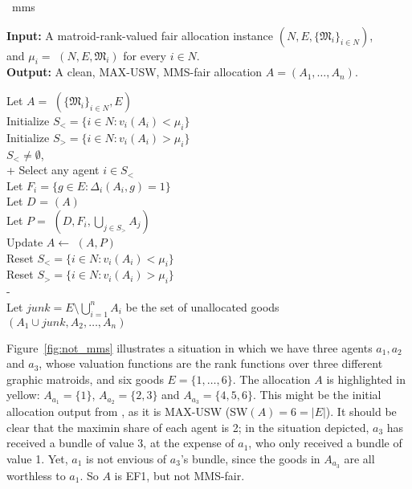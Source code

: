 \begin{algorithm}{~\cite{barman2021existence}}{mms}

\textbf{Input:}  \tab A matroid-rank-valued fair allocation instance $(N, E, \{\mathfrak{M}_i\}_{i\in N})$, \\
\mbox{}\tab and $\mu_i =$ $(N, E, \mathfrak{M}_i)$ for every $i\in N$.\\
\textbf{Output:} \tab A clean, MAX-USW, MMS-fair allocation $A = (A_1,\dots,A_n)$.

\begin{pseudo}[label=\small\arabic*, indent-mark]
Let $A =$ $(\{\mathfrak{M}_i\}_{i\in N}, E)$  \\
Initialize $S_< = \{ i\in N : v_i(A_i) < \mu_i \}$ \\
Initialize $S_> = \{ i\in N : v_i(A_i) > \mu_i \}$ \\
 $S_<\neq\emptyset$,   \\+
    Select any agent $i \in S_<$\\
    Let $F_i = \{ g\in E : \Delta_i(A_i, g) = 1 \}$ \\
    Let $D$ = $(A)$ \\
    Let $P =$ $(D, F_i, \bigcup_{j\in S_>}A_j)$ \\
    Update $A \leftarrow$ $(A,P)$ \\
    Reset $S_< = \{ i\in N : v_i(A_i) < \mu_i \}$ \\
    Reset $S_> = \{ i\in N : v_i(A_i) > \mu_i \}$ \\-
 \\
Let $junk = E \setminus \bigcup_{i=1}^n A_i$ be the set of unallocated goods \\
 $(A_1 \cup junk, A_2,\dots,A_n)$
\end{pseudo}
  
\end{algorithm}

Figure~\ref{fig:not_mms} illustrates a situation in which we have three agents $a_1, a_2$ and $a_3$, whose valuation functions are the rank functions over three different graphic matroids, and six goods $E=\{1,\dots,6\}$. The allocation $A$ is highlighted in yellow: $A_{a_1} = \{1\}$, $A_{a_2} = \{2,3\}$ and $A_{a_3} = \{4,5,6\}$. This might be the initial allocation output from , as it is MAX-USW (SW$(A) = 6 = |E|$). It should be clear that the maximin share of each agent is 2; in the situation depicted, $a_3$ has received a bundle of value 3, at the expense of $a_1$, who only received a bundle of value 1. Yet, $a_1$ is not envious of $a_3$'s bundle, since the goods in $A_{a_3}$ are all worthless to $a_1$. So $A$ is EF1, but not MMS-fair. 

